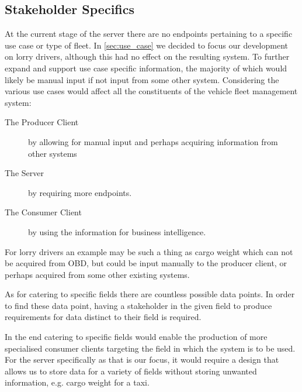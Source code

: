 \subsection{Stakeholder Specifics}
%
%
At the current stage of the server there are no endpoints pertaining to a specific use case or type of fleet.
In \cref{sec:use_case} we decided to focus our development on lorry drivers, although this had no effect on the resulting system.
To further expand and support use case specific information, the majority of which would likely be manual input if not input from some other system.
Considering the various use cases would affect all the constituents of the vehicle fleet management system:
\begin{description}
    \item [The Producer Client] by allowing for manual input and perhaps acquiring information from other systems
    \item [The Server] by requiring more endpoints.
    \item [The Consumer Client] by using the information for business intelligence.
\end{description}
For lorry drivers an example may be such a thing as cargo weight which can not be acquired from \ac{OBD}, but could be input manually to the producer client, or perhaps acquired from some other existing systems.

As for catering to specific fields there are countless possible data points.
In order to find these data point, having a stakeholder in the given field to produce requirements for data distinct to their field is required.

In the end catering to specific fields would enable the production of more specialised consumer clients targeting the field in which the system is to be used.
For the server specifically as that is our focus, it would require a design that allows us to store data for a variety of fields without storing unwanted information, e.g. cargo weight for a taxi.

